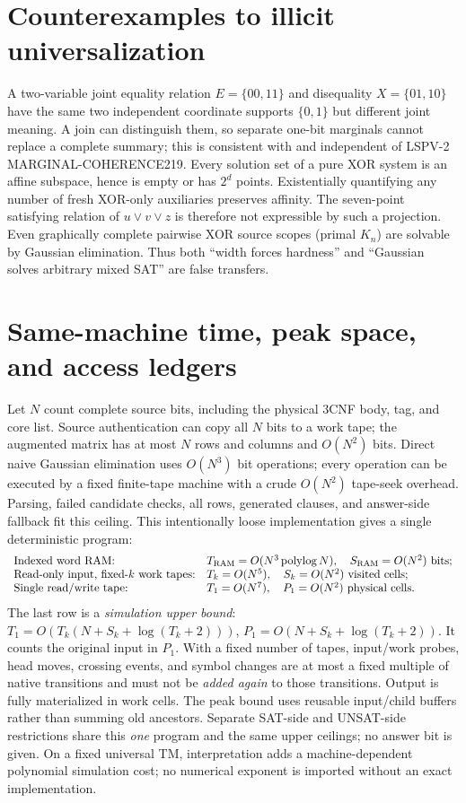 \documentclass[11pt]{article}
\begin{document}
\section{Counterexamples to illicit universalization}
A two-variable joint equality relation $E=\{00,11\}$ and disequality $X=\{01,10\}$ have the same two independent coordinate supports $\{0,1\}$ but different joint meaning. A join can distinguish them, so separate one-bit marginals cannot replace a complete summary; this is consistent with and independent of LSPV-2 MARGINAL-COHERENCE219. Every solution set of a pure XOR system is an affine subspace, hence is empty or has $2^d$ points. Existentially quantifying any number of fresh XOR-only auxiliaries preserves affinity. The seven-point satisfying relation of $u\vee v\vee z$ is therefore not expressible by such a projection. Even graphically complete pairwise XOR source scopes (primal $K_n$) are solvable by Gaussian elimination. Thus both ``width forces hardness'' and ``Gaussian solves arbitrary mixed SAT'' are false transfers.

\section{Same-machine time, peak space, and access ledgers}
Let $N$ count complete source bits, including the physical 3CNF body, tag, and core list. Source authentication can copy all $N$ bits to a work tape; the augmented matrix has at most $N$ rows and columns and $O(N^2)$ bits. Direct naive Gaussian elimination uses $O(N^3)$ bit operations; every operation can be executed by a fixed finite-tape machine with a crude $O(N^2)$ tape-seek overhead. Parsing, failed candidate checks, all rows, generated clauses, and answer-side fallback fit this ceiling. This intentionally loose implementation gives a single deterministic program:
\[
\begin{array}{ll}
\text{Indexed word RAM:} & T_{\rm RAM}=O(N^3\operatorname{polylog}N),\quad S_{\rm RAM}=O(N^2)\text{ bits};\\
\text{Read-only input, fixed-$k$ work tapes:} &T_k=O(N^5),\quad S_k=O(N^2)\text{ visited cells};\\
\text{Single read/write tape:} & T_1=O(N^7),\quad P_1=O(N^2)\text{ physical cells}.\end{array}
\]
The last row is a \emph{simulation upper bound}: $T_1=O(T_k(N+S_k+\log(T_k+2)))$, $P_1=O(N+S_k+\log(T_k+2))$. It counts the original input in $P_1$. With a fixed number of tapes, input/work probes, head moves, crossing events, and symbol changes are at most a fixed multiple of native transitions and must not be \emph{added again} to those transitions. Output is fully materialized in work cells. The peak bound uses reusable input/child buffers rather than summing old ancestors. Separate SAT-side and UNSAT-side restrictions share this \emph{one} program and the same upper ceilings; no answer bit is given. On a fixed universal TM, interpretation adds a machine-dependent polynomial simulation cost; no numerical exponent is imported without an exact implementation.
\end{document}
